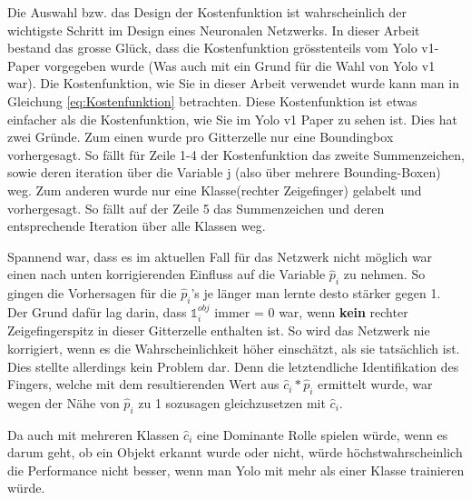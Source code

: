 Die Auswahl bzw. das Design der Kostenfunktion ist wahrscheinlich der wichtigste Schritt im Design eines Neuronalen Netzwerks. 
In dieser Arbeit bestand das grosse Glück, dass die Kostenfunktion grösstenteils vom Yolo v1-Paper \cite{yolo} vorgegeben wurde (Was auch mit ein Grund für die Wahl von Yolo v1 war).
Die Kostenfunktion, wie Sie in dieser Arbeit verwendet wurde kann man in Gleichung \ref{eq:Kostenfunktion} betrachten. 
Diese Kostenfunktion ist etwas einfacher als die Kostenfunktion, wie Sie im Yolo v1 Paper zu sehen ist. 
Dies hat zwei Gründe. 
Zum einen wurde pro Gitterzelle nur eine Boundingbox vorhergesagt. 
So fällt für Zeile 1-4 der Kostenfunktion das zweite Summenzeichen, sowie deren iteration über die Variable j (also über mehrere Bounding-Boxen) weg. 
Zum anderen wurde nur eine Klasse(rechter Zeigefinger) gelabelt und vorhergesagt.
So fällt auf der Zeile 5 das Summenzeichen und deren entsprechende Iteration über alle Klassen weg.

Spannend war, dass es im aktuellen Fall für das Netzwerk nicht möglich war einen nach unten korrigierenden Einfluss auf die Variable $\hat{p}_i$ zu nehmen.
So gingen die Vorhersagen für die $\hat{p}_i$'s je länger man lernte desto stärker gegen 1.  
Der Grund dafür lag darin, dass $\mathds{1}_{i}^{obj}$ immer = 0 war, wenn \textbf{kein} rechter Zeigefingerspitz in dieser Gitterzelle enthalten ist.
So wird das Netzwerk nie korrigiert, wenn es die Wahrscheinlichkeit höher einschätzt, als sie tatsächlich ist. 
Dies stellte allerdings kein Problem dar. 
Denn die letztendliche Identifikation des Fingers, welche mit dem resultierenden Wert aus $\hat{c}_i * \hat{p}_i$ ermittelt wurde, war wegen der Nähe von $\hat{p}_i$ zu 1 sozusagen gleichzusetzen mit $\hat{c}_i$.

Da auch mit mehreren Klassen $\hat{c}_i$ eine Dominante Rolle spielen würde, wenn es darum geht, ob ein Objekt erkannt wurde oder nicht, würde höchstwahrscheinlich die Performance nicht besser, wenn man Yolo mit mehr als einer Klasse trainieren würde.






 


